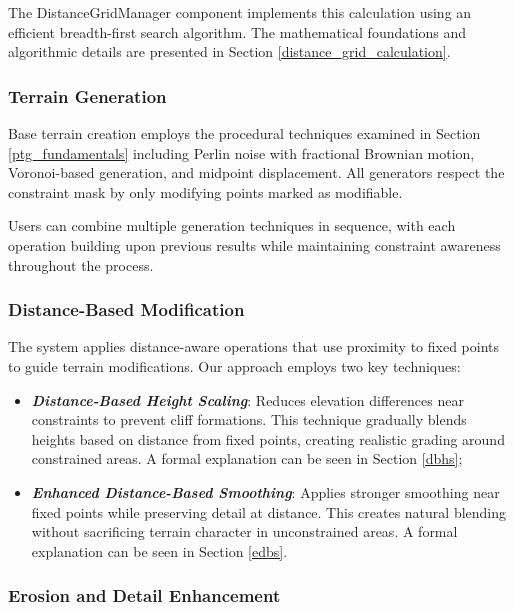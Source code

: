 The \textsf{DistanceGridManager} component implements this calculation using an efficient breadth-first search algorithm. The mathematical foundations and algorithmic details are presented in Section \ref{distance_grid_calculation}.

\subsubsection{Terrain Generation}

Base terrain creation employs the procedural techniques examined in Section \ref{ptg_fundamentals} including Perlin noise with fractional Brownian motion, Voronoi-based generation, and midpoint displacement. All generators respect the constraint mask by only modifying points marked as modifiable.

Users can combine multiple generation techniques in sequence, with each operation building upon previous results while maintaining constraint awareness throughout the process.


 \subsubsection{Distance-Based Modification}

The system applies distance-aware operations that use proximity to fixed points to guide terrain modifications. Our approach employs two key techniques:

\begin{itemize}
    \item \textbf{\textit{Distance-Based Height Scaling}}: Reduces elevation differences near constraints to prevent cliff formations. This technique gradually blends heights based on distance from fixed points, creating realistic grading around constrained areas. A formal explanation can be seen in Section \ref {dbhs};
    \item \textbf{\textit{Enhanced Distance-Based Smoothing}}: Applies stronger smoothing near fixed points while preserving detail at distance. This creates natural blending without sacrificing terrain character in unconstrained areas. A formal explanation can be seen in Section \ref{edbs}. 
\end{itemize}

\subsubsection{Erosion and Detail Enhancement}


